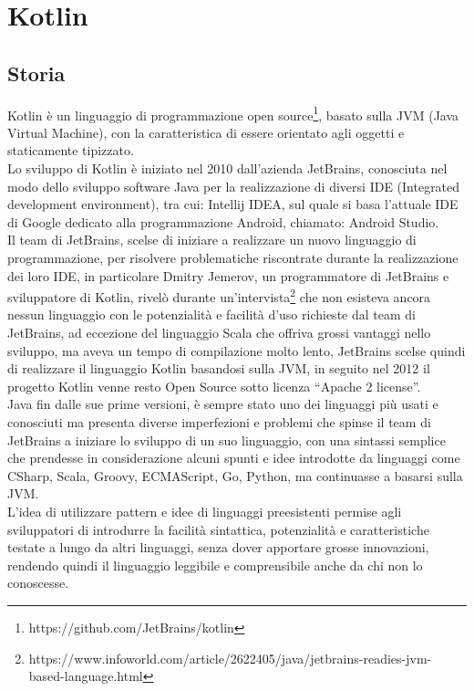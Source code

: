 \chapter{Kotlin}                %
\lhead[\fancyplain{}{\bfseries\thepage}]{\fancyplain{}{\bfseries\rightmark}}
\section{Storia}                 %

Kotlin è un linguaggio di programmazione open source\footnote{https://github.com/JetBrains/kotlin}, basato sulla JVM (Java Virtual Machine), con la caratteristica di essere orientato agli oggetti e staticamente tipizzato. \\
Lo sviluppo di Kotlin è iniziato nel 2010 dall'azienda JetBrains, conosciuta nel modo dello sviluppo software Java per la realizzazione di diversi IDE (Integrated development environment), tra cui: Intellij IDEA, sul quale si basa l'attuale IDE di Google dedicato alla programmazione Android, chiamato: Android Studio.\\
Il team di JetBrains, scelse di iniziare a realizzare un nuovo linguaggio di programmazione, per risolvere problematiche riscontrate durante la realizzazione dei loro IDE, in particolare Dmitry Jemerov, un programmatore di JetBrains e sviluppatore di Kotlin, rivelò durante un'intervista\footnote{https://www.infoworld.com/article/2622405/java/jetbrains-readies-jvm-based-language.html} che non esisteva ancora nessun linguaggio con le potenzialità e facilità d'uso richieste dal team di JetBrains, ad eccezione del linguaggio Scala che offriva grossi vantaggi nello sviluppo, ma aveva un tempo di compilazione molto lento, JetBrains scelse quindi di realizzare il linguaggio Kotlin basandosi sulla JVM, in seguito nel 2012 il progetto Kotlin venne resto Open Source sotto licenza ``Apache 2 license''.\\
Java fin dalle sue prime versioni, è sempre stato uno dei linguaggi  più usati e conosciuti ma presenta diverse imperfezioni e problemi che spinse il team di JetBrains a iniziare lo sviluppo di un suo linguaggio, con una sintassi semplice che prendesse in considerazione alcuni spunti e idee introdotte da linguaggi come CSharp, Scala, Groovy, ECMAScript, Go, Python, ma continuasse a basarsi sulla JVM.\\
L'idea di utilizzare pattern e idee di linguaggi preesistenti permise agli sviluppatori di introdurre la facilità sintattica, potenzialità e caratteristiche testate a lungo da altri linguaggi, senza dover apportare grosse innovazioni, rendendo quindi il linguaggio leggibile e comprensibile anche da chi non lo conoscesse.\\
